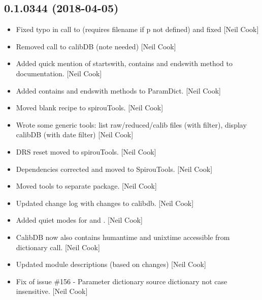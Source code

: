 \documentclass[a4paper,10pt,english]{report}
\begin{document}
\subsection{0.1.0344 (2018-04-05)}
\label{\detokenize{misc/changelog:id468}}\begin{itemize}
\item {} 
Fixed typo in call to  (requires filename if p not
defined) and fixed  {[}Neil Cook{]}

\item {} 
Removed call to calibDB (note needed) {[}Neil Cook{]}

\item {} 
Added quick mention of startswith, contains and endswith method to
documentation. {[}Neil Cook{]}

\item {} 
Added contains and endswith methods to ParamDict. {[}Neil Cook{]}

\item {} 
Moved blank recipe to spirouTools. {[}Neil Cook{]}

\item {} 
Wrote some generic tools: list raw/reduced/calib files (with filter),
display calibDB (with date filter) {[}Neil Cook{]}

\item {} 
DRS reset moved to spirouTools. {[}Neil Cook{]}

\item {} 
Dependencies corrected and moved to SpirouTools. {[}Neil Cook{]}

\item {} 
Moved tools to separate package. {[}Neil Cook{]}

\item {} 
Updated change log with changes to calibdb. {[}Neil Cook{]}

\item {} 
Added quiet modes for  and . {[}Neil Cook{]}

\item {} 
CalibDB now also contains humantime and unixtime accessible from
dictionary call. {[}Neil Cook{]}

\item {} 
Updated module descriptions (based on changes) {[}Neil Cook{]}

\item {} 
Fix of issue \#156 - Parameter dictionary source dictionary not case
insensitive. {[}Neil Cook{]}


\end{itemize}
\end{document}

